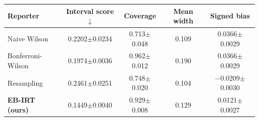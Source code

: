\begin{tabular}{lcccc}
\toprule
Reporter & Interval score $\downarrow$ & Coverage & Mean width & Signed bias \\
\midrule
Naive Wilson & 0.2202$\pm$0.0234 & 0.713$\pm$0.048 & 0.109 & 0.0366$\pm$0.0029 \\
Bonferroni-Wilson & 0.1974$\pm$0.0036 & 0.962$\pm$0.012 & 0.190 & 0.0366$\pm$0.0029 \\
Resampling & 0.2461$\pm$0.0251 & 0.748$\pm$0.020 & 0.104 & $-$0.0209$\pm$0.0030 \\
\textbf{EB-IRT (ours)} & 0.1449$\pm$0.0040 & 0.929$\pm$0.008 & 0.129 & 0.0121$\pm$0.0027 \\
\bottomrule
\end{tabular}
